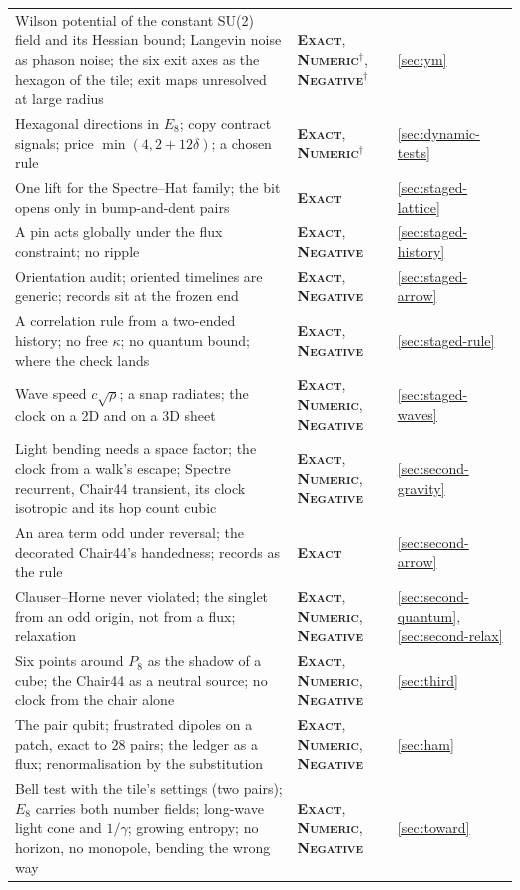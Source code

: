 \documentclass[11pt]{article}
\newcommand{\exact}{\textbf{\textsc{Exact}}}
\newcommand{\numeric}{\textbf{\textsc{Numeric}}}
\newcommand{\negres}{\textbf{\textsc{Negative}}}
\theoremstyle{definition}
\begin{document}
\begin{table}[t]
\begin{tabular}{@{}p{104mm}p{26mm}p{14mm}@{}}
Wilson potential of the constant SU(2) field and its Hessian bound; Langevin noise as phason noise; the six exit axes as the hexagon of the tile; exit maps unresolved at large radius & \exact, \numeric$^\dagger$, \negres$^\dagger$ & \ref{sec:ym} \\
Hexagonal directions in $E_8$; copy contract signals; price $\min(4,2+12\delta)$; a chosen rule & \exact, \numeric$^\dagger$ & \ref{sec:dynamic-tests} \\
One lift for the Spectre--Hat family; the bit opens only in bump-and-dent pairs & \exact & \ref{sec:staged-lattice} \\
A pin acts globally under the flux constraint; no ripple & \exact, \negres & \ref{sec:staged-history} \\
Orientation audit; oriented timelines are generic; records sit at the frozen end & \exact, \negres & \ref{sec:staged-arrow} \\
A correlation rule from a two-ended history; no free $\kappa$; no quantum bound; where the check lands & \exact, \negres & \ref{sec:staged-rule} \\
Wave speed $c\sqrt\rho$; a snap radiates; the clock on a 2D and on a 3D sheet & \exact, \numeric, \negres & \ref{sec:staged-waves} \\
Light bending needs a space factor; the clock from a walk's escape; Spectre recurrent, Chair44 transient, its clock isotropic and its hop count cubic & \exact, \numeric, \negres & \ref{sec:second-gravity} \\
An area term odd under reversal; the decorated Chair44's handedness; records as the rule & \exact & \ref{sec:second-arrow} \\
Clauser--Horne never violated; the singlet from an odd origin, not from a flux; relaxation & \exact, \numeric, \negres & \ref{sec:second-quantum}, \ref{sec:second-relax} \\
Six points around $P_8$ as the shadow of a cube; the Chair44 as a neutral source; no clock from the chair alone & \exact, \numeric, \negres & \ref{sec:third} \\
The pair qubit; frustrated dipoles on a patch, exact to $28$ pairs; the ledger as a flux; renormalisation by the substitution & \exact, \numeric, \negres & \ref{sec:ham} \\
Bell test with the tile's settings (two pairs); $E_8$ carries both number fields; long-wave light cone and $1/\gamma$; growing entropy; no horizon, no monopole, bending the wrong way & \exact, \numeric, \negres & \ref{sec:toward} \\

\end{tabular}
\end{table}
\end{document}
